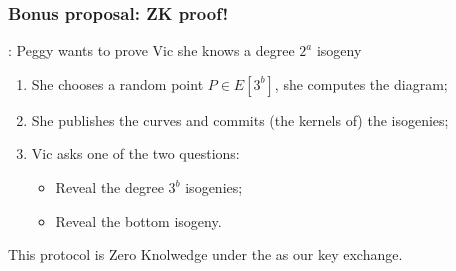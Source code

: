 \documentclass{beamer}
\renewcommand{\emph}[1]{}
\begin{document}
\begin{frame}
  \frametitle{Bonus proposal: ZK proof!}
  
  \emph{Secret}: Peggy wants to prove Vic she knows a degree $2^a$ isogeny

  \begin{center}
  \end{center}

  \begin{enumerate}
  \item<2-> She chooses a random point $P\in E[3^b]$, she computes the diagram;
  \item<2-> She publishes the curves and commits (the kernels of) the isogenies;
  \item<3-> Vic asks one of the two questions:
    \begin{itemize}
    \item<3-> Reveal the degree $3^b$ isogenies;
    \item<4-> Reveal the bottom isogeny.
    \end{itemize}
  \end{enumerate}
  
  This protocol is \alert{Zero Knolwedge} under the \emph{same
    (baroque) assumptions} as our key exchange.
\end{frame}

\end{document}

